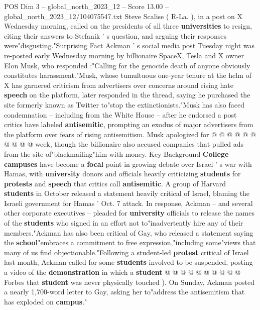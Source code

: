\begin{textsample}{POS Dim 3 – global\_north\_2023\_12 – Score 13.00 – global\_north\_2023\_12/104075547.txt}
Steve Scalise ( R-La. ), in a post on X Wednesday morning, called on the presidents of all three \textbf{universities} to resign, citing their answers to Stefanik ' s question, and arguing their responses were"disgusting."Surprising Fact Ackman ' s social media post Tuesday night was re-posted early Wednesday morning by billionaire SpaceX, Tesla and X owner Elon Musk, who responded :"Calling for the genocide death of anyone obviously constitutes harassment."Musk, whose tumultuous one-year tenure at the helm of X has garnered criticism from advertisers over concerns around rising hate \textbf{speech} on the platform, later responded in the thread, saying he purchased the site formerly known as Twitter to"stop the extinctionists."Musk has also faced condemnation -- including from the White House -- after he endorsed a post critics have labeled \textbf{antisemitic}, prompting an exodus of major advertisers from the platform over fears of rising antisemitism.
Musk apologized for @ @ @ @ @ @ @ @ @ @ week, though the billionaire also accused companies that pulled ads from the site of"blackmailing"him with money.
Key Background \textbf{College} \textbf{campuses} have become a \textbf{focal} point in growing debate over Israel ' s war with Hamas, with \textbf{university} donors and officials heavily criticizing \textbf{students} for \textbf{protests} and \textbf{speech} that critics call \textbf{antisemitic}.
A group of Harvard \textbf{students} in October released a statement heavily critical of Israel, blaming the Israeli government for Hamas ' Oct. 7 attack.
In response, Ackman -- and several other corporate executives -- pleaded for \textbf{university} officials to release the names of the \textbf{students} who signed in an effort not to"inadvertently hire any of their members."Ackman has also been critical of Gay, who released a statement saying the \textbf{school}"embraces a commitment to free expression,"including some"views that many of us find objectionable."Following a student-led \textbf{protest} critical of Israel last month, Ackman called for some \textbf{students} involved to be suspended, posting a video of the \textbf{demonstration} in which a \textbf{student} @ @ @ @ @ @ @ @ @ @ Forbes that \textbf{student} was never physically touched ).
On Sunday, Ackman posted a nearly 1,700-word letter to Gay, asking her to"address the antisemitism that has exploded on \textbf{campus}."

\end{textsample}
